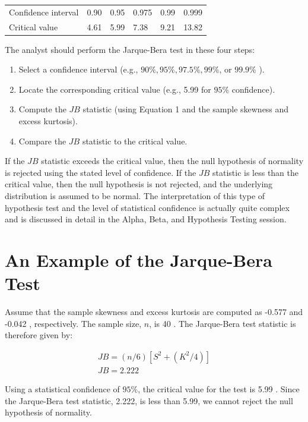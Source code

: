 \documentclass[11pt]{article}
\begin{document}
\begin{center}
\begin{tabular}{|llllll|}
\hline
Confidence interval & 0.90 & 0.95 & 0.975 & 0.99 & 0.999 \\
Critical value & 4.61 & 5.99 & 7.38 & 9.21 & 13.82 \\
\hline
\end{tabular}
\end{center}

The analyst should perform the Jarque-Bera test in these four steps:

\begin{enumerate}
  \item Select a confidence interval (e.g., $90 \%, 95 \%, 97.5 \%, 99 \%$, or $99.9 \%$ ).

  \item Locate the corresponding critical value (e.g., 5.99 for $95 \%$ confidence).

  \item Compute the $J B$ statistic (using Equation 1 and the sample skewness and excess kurtosis).

  \item Compare the $J B$ statistic to the critical value.

\end{enumerate}

If the $J B$ statistic exceeds the critical value, then the null hypothesis of normality is rejected using the stated level of confidence. If the $J B$ statistic is less than the critical value, then the null hypothesis is not rejected, and the underlying distribution is assumed to be normal. The interpretation of this type of hypothesis test and the level of statistical confidence is actually quite complex and is discussed in detail in the Alpha, Beta, and Hypothesis Testing session.

\section*{An Example of the Jarque-Bera Test}
Assume that the sample skewness and excess kurtosis are computed as -0.577 and -0.042 , respectively. The sample size, $n$, is 40 . The Jarque-Bera test statistic is therefore given by:

$$
\begin{gathered}
J B=(n / 6)\left[S^{2}+\left(K^{2} / 4\right)\right] \\
J B=2.222
\end{gathered}
$$

Using a statistical confidence of $95 \%$, the critical value for the test is 5.99 . Since the Jarque-Bera test statistic, 2.222, is less than 5.99, we cannot reject the null hypothesis of normality.
\end{document}
